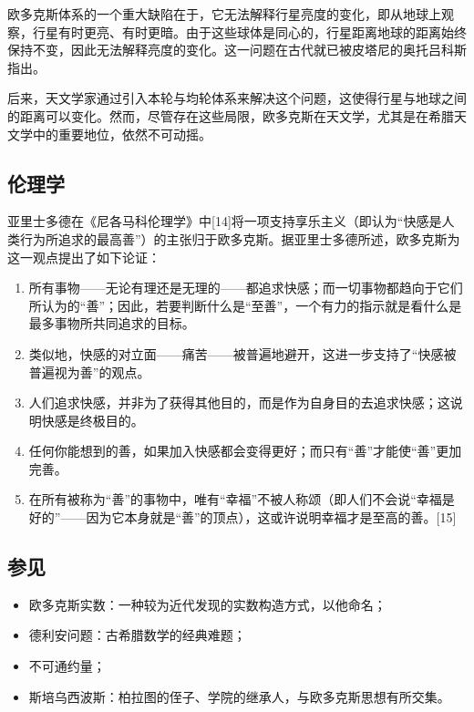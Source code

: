 欧多克斯体系的一个重大缺陷在于，它无法解释行星亮度的变化，即从地球上观察，行星有时更亮、有时更暗。由于这些球体是同心的，行星距离地球的距离始终保持不变，因此无法解释亮度的变化。这一问题在古代就已被皮塔尼的奥托吕科斯指出。

后来，天文学家通过引入本轮与均轮体系来解决这个问题，这使得行星与地球之间的距离可以变化。然而，尽管存在这些局限，欧多克斯在天文学，尤其是在希腊天文学中的重要地位，依然不可动摇。
\subsection{伦理学}
亚里士多德在《尼各马科伦理学》中[14]将一项支持享乐主义（即认为“快感是人类行为所追求的最高善”）的主张归于欧多克斯。据亚里士多德所述，欧多克斯为这一观点提出了如下论证：
\begin{enumerate}
\item 所有事物——无论有理还是无理的——都追求快感；而一切事物都趋向于它们所认为的“善”；因此，若要判断什么是“至善”，一个有力的指示就是看什么是最多事物所共同追求的目标。
\item 类似地，快感的对立面——痛苦——被普遍地避开，这进一步支持了“快感被普遍视为善”的观点。
\item 人们追求快感，并非为了获得其他目的，而是作为自身目的去追求快感；这说明快感是终极目的。
\item 任何你能想到的善，如果加入快感都会变得更好；而只有“善”才能使“善”更加完善。
\item 在所有被称为“善”的事物中，唯有“幸福”不被人称颂（即人们不会说“幸福是好的”——因为它本身就是“善”的顶点），这或许说明幸福才是至高的善。[15]
\end{enumerate}
\subsection{参见}
\begin{itemize}
\item 欧多克斯实数：一种较为近代发现的实数构造方式，以他命名；
\item 德利安问题：古希腊数学的经典难题；
\item 不可通约量；
\item 斯培乌西波斯：柏拉图的侄子、学院的继承人，与欧多克斯思想有所交集。
\end{itemize}
